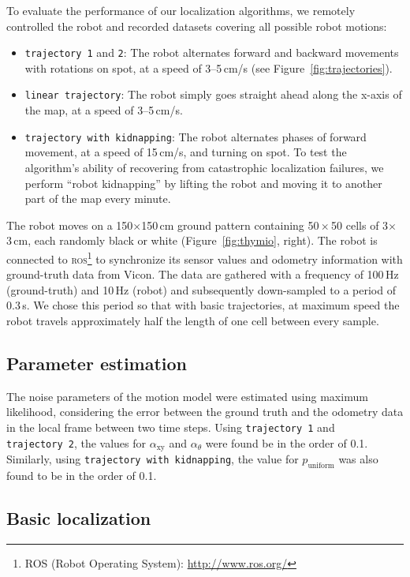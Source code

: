 \documentclass[letterpaper, 10pt, conference]{ieeeconf}
\newcommand{\fig}[1]{Figure~\ref{fig:#1}}
\begin{document}
To evaluate the performance of our localization algorithms, we remotely controlled the robot and recorded datasets covering all possible robot motions:
\begin{itemize}
\item \texttt{trajectory 1} and \texttt{2}: The robot alternates forward and backward movements with rotations on spot, at a speed of 3--5\,cm/s (see \fig{trajectories}).
\item \texttt{linear trajectory}: The robot simply goes straight ahead along the x-axis of the map, at a speed of 3--5\,cm/s.
\item \texttt{trajectory with kidnapping}: The robot alternates phases of forward movement, at a speed of 15\,cm/s, and turning on spot.
To test the algorithm's ability of recovering from catastrophic localization failures, we perform ``robot kidnapping'' by lifting the robot and moving it to another part of the map every minute.
\end{itemize}
The robot moves on a 150$\times$150\,cm ground pattern containing 50\,$\times$\,50 cells of 3$\times$3\,cm, each randomly black or white (\fig{thymio}, right).
The robot is connected to \textsc{ros}\footnote{ROS (Robot Operating System): \url{http://www.ros.org/}} to synchronize its sensor values and odometry information with ground-truth data from Vicon.
The data are gathered with a frequency of 100\,Hz (ground-truth) and 10\,Hz (robot) and subsequently down-sampled to a period of 0.3\,s.
We chose this period so that with basic trajectories, at maximum speed the robot travels approximately half the length of one cell between every sample.

\subsection{Parameter estimation}
\label{sec:mle}

The noise parameters of the motion model were estimated using maximum likelihood, considering the error between the ground truth and the odometry data in the local frame between two time steps.
Using \texttt{trajectory~1} and \texttt{trajectory~2}, the values for  $\alpha_\mathrm{xy}$ and $\alpha_\theta$ were found be in the order of 0.1.
Similarly, using \texttt{trajectory with kidnapping}, the value for $p_\mathrm{uniform}$ was also found to be in the order of 0.1.

\subsection{Basic localization}
\end{document}
